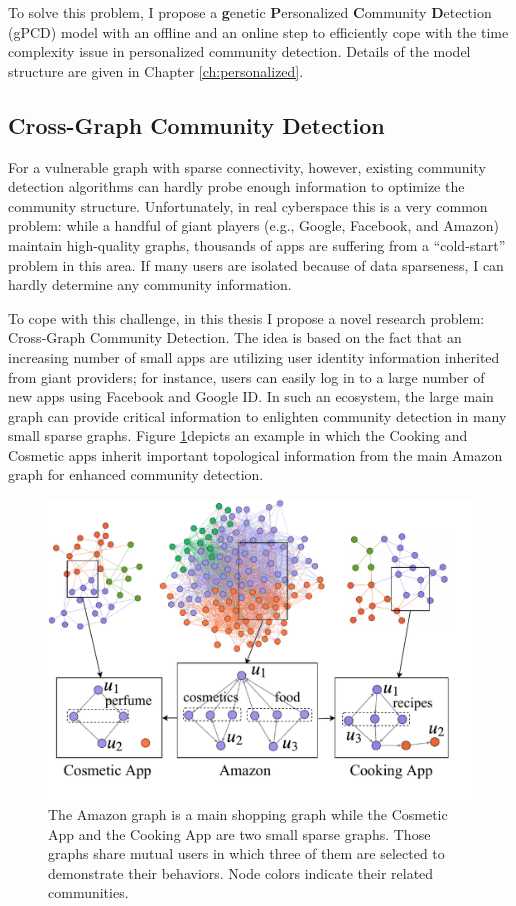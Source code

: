 To solve this problem, I propose a \textbf{g}enetic \textbf{P}ersonalized \textbf{C}ommunity \textbf{D}etection (gPCD) model with an offline and an online step to efficiently cope with the time complexity issue in personalized community detection.  Details of the model structure are given in Chapter \ref{ch:personalized}.

\subsection{Cross-Graph Community Detection}
For a vulnerable graph with sparse connectivity, however, existing community detection algorithms can hardly probe enough information to optimize the community structure. Unfortunately, in real cyberspace this is a very common problem: while a handful of giant players (e.g., Google, Facebook, and Amazon) maintain high-quality graphs, thousands of apps are suffering from a “cold-start” problem in this area. If many users are isolated because of data sparseness, I can hardly determine any community information. 

To cope with this challenge, in this thesis I propose a novel research problem: Cross-Graph Community Detection. The idea is based on the fact that an increasing number of small apps are utilizing user identity information inherited from giant providers; for instance, users can easily log in to a large number of new apps using Facebook and Google ID. In such an ecosystem, the large main graph can provide critical information to enlighten community detection in many small sparse graphs. Figure \ref{fig:c4_example}depicts an example in which the Cooking and Cosmetic apps inherit important topological information from the main Amazon graph for enhanced community detection.

\begin{figure}  
	\centering
	\includegraphics[width=0.8\columnwidth]{img/chapter4/example.pdf}
	\caption{The Amazon graph is a main shopping graph while the Cosmetic App and the Cooking App are two small sparse graphs. Those graphs share mutual users in which three of them are selected to demonstrate their behaviors. Node colors indicate their related communities. }
	\label{fig:c4_example}
\end{figure}

